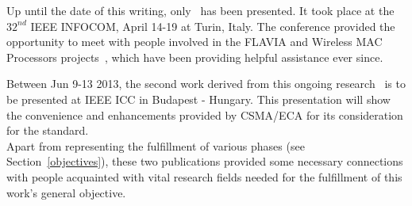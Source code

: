Up until the date of this writing, only~\cite{fairness-ECA} has been presented. It took place at the $32^{nd}$ IEEE INFOCOM, April 14-19 at Turin, Italy. The conference provided the opportunity to meet with people involved in the FLAVIA and Wireless MAC Processors projects~\cite{FLAVIA,WMP}, which have been providing helpful assistance ever since. 

Between Jun 9-13 2013, the second work derived from this ongoing research~\cite{research2standards} is to be presented at IEEE ICC in Budapest - Hungary. This presentation will show the convenience and enhancements provided by CSMA/ECA for its consideration for the standard.\\

Apart from representing the fulfillment of various phases (see Section~\ref{objectives}), these two publications provided some necessary connections with people acquainted with vital research fields needed for the fulfillment of this work's general objective.